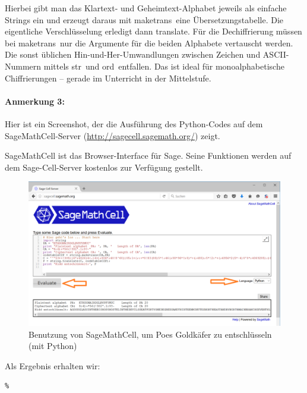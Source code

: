\begin{refsegment}
Hierbei gibt man das Klartext- und Geheimtext-Alphabet jeweils als einfache Strings
ein und erzeugt daraus mit \glqq maketrans\grqq~eine Übersetzungstabelle. Die
eigentliche Verschlüsselung erledigt dann \glqq translate\grqq. Für die Dechiffrierung
müssen bei \glqq maketrans\grqq~nur die Argumente für die beiden Alphabete
vertauscht werden. Die sonst üblichen Hin-und-Her-Umwandlungen zwischen Zeichen und
ASCII-Nummern mittels \glqq str\grqq~und \glqq ord\grqq~entfallen.
Das ist ideal für monoalphabetische Chiffrierungen -- gerade im Unterricht in der Mittelstufe.


\paragraph*{Anmerkung 3:}
Hier ist ein Screenshot, der die Ausführung des Python-Codes auf dem SageMathCell-Server
(\url{http://sagecell.sagemath.org/}) zeigt.

SageMathCell ist das Browser-Interface für Sage. Seine Funktionen werden auf dem Sage-Cell-Server
kostenlos zur Verfügung gestellt.

\begin{figure}[ht]
\begin{center}
\includegraphics[scale=0.53]{../en/figures/Using-SageMathCell-with-Python-for-Poes-GoldBug}
\caption{Benutzung von SageMathCell, um Poes Goldkäfer zu entschlüsseln (mit Python)}
\label{MOV_Using-SageMathCell-with-Python-for-Poes-GoldBug}
\end{center}
\end{figure}


\noindent Als Ergebnis erhalten wir:

\begin{Verbatim}%


\end{Verbatim}
\end{refsegment}
